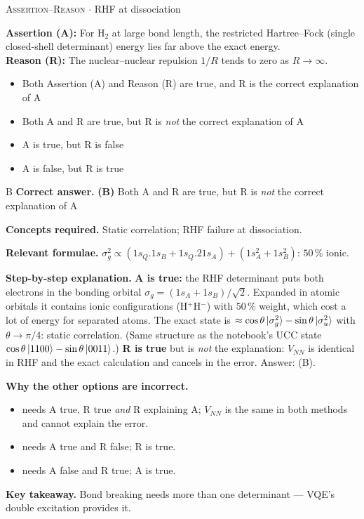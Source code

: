 \documentclass[11pt,a4paper]{article}
\newcommand{\optlabel}[1]{\textbf{(#1)}}
\newcommand{\correctlabel}[1]{\textcolor{okgreen}{\textbf{(#1)}\,\ding{51}}}
\newenvironment{qitem}[1]{\begin{list}{}{\setlength{\leftmargin}{3.3em}\setlength{\labelwidth}{3.1em}%
  \setlength{\labelsep}{0.2em}\setlength{\topsep}{3pt}\setlength{\parsep}{3pt}}\item[\textbf{Q.#1}\hfill]}{\end{list}}
\newcommand{\qsep}{\par\vspace{2pt}{\color{black!15}\hrule}\vspace{4pt}}
\newcommand{\qmeta}[2]{{\footnotesize\color{black!60}\textsc{#1} \;$\cdot$\; #2}\par}
\begin{document}
\begin{qitem}{18}
\qmeta{Assertion--Reason}{RHF at dissociation}
\textbf{Assertion (A):} For H$_2$ at large bond length, the restricted Hartree--Fock (single closed-shell determinant) energy lies far above
the exact energy.\\[1mm]
\textbf{Reason (R):} The nuclear--nuclear repulsion $1/R$ tends to zero as $R \to \infty$.
\begin{itemize}[leftmargin=2.6em, labelsep=0.4em, itemsep=2pt, topsep=3pt]
\item[\optlabel{A}] Both Assertion (A) and Reason (R) are true, and R is the correct explanation of A
\item[\correctlabel{B}] Both A and R are true, but R is \emph{not} the correct explanation of A
\item[\optlabel{C}] A is true, but R is false
\item[\optlabel{D}] A is false, but R is true
\end{itemize}
\end{qitem}
\begin{solbox}{B}
\textbf{\color{brand}Correct answer.} \textcolor{okgreen}{\textbf{(B)}} Both A and R are true, but R is \emph{not} the correct explanation of A

\textbf{\color{brand}Concepts required.} Static correlation; RHF failure at dissociation.

\textbf{\color{brand}Relevant formulae.} $\sigma_g^2 \propto (1s_Q.1s_B + 1s_Q.21s_A) + (1s_A^2 + 1s_B^2)$: $50\,\%$ ionic.

\textbf{\color{brand}Step-by-step explanation.} \textbf{A is true:} the RHF determinant puts both electrons in the bonding orbital $\sigma_g = (1s_A + 1s_B)/\sqrt2$. Expanded in atomic
orbitals it contains ionic configurations (H$^+$H$^-$) with $50\,\%$ weight, which cost a lot of energy for separated atoms. The exact
state is $\approx \cos\theta\ket{\sigma_g^2} - \sin\theta\ket{\sigma_u^2}$ with $\theta \to \pi/4$: static correlation. (Same structure as the notebook's UCC
state $\cos\theta\ket{1100} - \sin\theta\ket{0011}$.)
\textbf{R is true} but is \emph{not} the explanation: $V_{NN}$ is identical in RHF and the exact calculation and cancels in the error. Answer: (B).

\textbf{\color{brand}Why the other options are incorrect.}
\begin{itemize}[leftmargin=2.4em, itemsep=1pt, topsep=2pt]
\item[\textbf{(A)}] needs A true, R true \emph{and} R explaining A; $V_{NN}$ is the same in both methods and cannot explain the error.
\item[\textbf{(C)}] needs A true and R false; R is true.
\item[\textbf{(D)}] needs A false and R true; A is true.
\end{itemize}
\textbf{\color{brand}Key takeaway.} Bond breaking needs more than one determinant --- VQE's double excitation provides it.
\end{solbox}
\qsep
\end{document}
